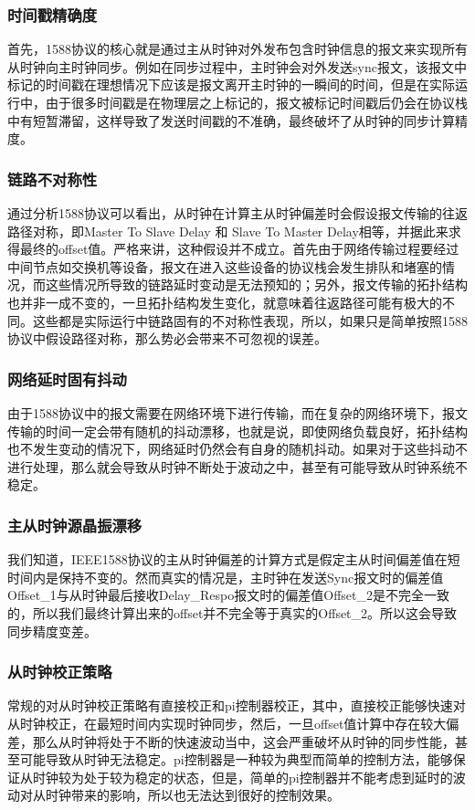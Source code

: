 \subsubsection{时间戳精确度}
\label{sec:1588_problem_timestamp_accu}
首先，1588协议的核心就是通过主从时钟对外发布包含时钟信息的报文来实现所有从时钟向主时钟同步。例如在同步过程中，主时钟会对外发送sync报文，该报文中标记的时间戳在理想情况下应该是报文离开主时钟的一瞬间的时间，但是在实际运行中，由于很多时间戳是在物理层之上标记的，报文被标记时间戳后仍会在协议栈中有短暂滞留，这样导致了发送时间戳的不准确，最终破坏了从时钟的同步计算精度。

\subsubsection{链路不对称性}
\label{sec:1588_problem_route_time_delay}
通过分析1588协议可以看出，从时钟在计算主从时钟偏差时会假设报文传输的往返路径对称，即Master To Slave Delay 和 Slave To Master Delay相等，并据此来求得最终的offset值。严格来讲，这种假设并不成立。首先由于网络传输过程要经过中间节点如交换机等设备，报文在进入这些设备的协议栈会发生排队和堵塞的情况，而这些情况所导致的链路延时变动是无法预知的；另外，报文传输的拓扑结构也并非一成不变的，一旦拓扑结构发生变化，就意味着往返路径可能有极大的不同。这些都是实际运行中链路固有的不对称性表现，所以，如果只是简单按照1588协议中假设路径对称，那么势必会带来不可忽视的误差。

\subsubsection{网络延时固有抖动}
由于1588协议中的报文需要在网络环境下进行传输，而在复杂的网络环境下，报文传输的时间一定会带有随机的抖动漂移，也就是说，即使网络负载良好，拓扑结构也不发生变动的情况下，网络延时仍然会有自身的随机抖动。如果对于这些抖动不进行处理，那么就会导致从时钟不断处于波动之中，甚至有可能导致从时钟系统不稳定。

\subsubsection{主从时钟源晶振漂移}
我们知道，IEEE1588协议的主从时钟偏差的计算方式是假定主从时间偏差值在短时间内是保持不变的。然而真实的情况是，主时钟在发送Sync报文时的偏差值Offset\_1与从时钟最后接收Delay\_Respo报文时的偏差值Offset\_2是不完全一致的，所以我们最终计算出来的offset并不完全等于真实的Offset\_2。所以这会导致同步精度变差。

\subsubsection{从时钟校正策略}
常规的对从时钟校正策略有直接校正和pi控制器校正，其中，直接校正能够快速对从时钟校正，在最短时间内实现时钟同步，然后，一旦offset值计算中存在较大偏差，那么从时钟将处于不断的快速波动当中，这会严重破坏从时钟的同步性能，甚至可能导致从时钟无法稳定。pi控制器是一种较为典型而简单的控制方法，能够保证从时钟较为处于较为稳定的状态，但是，简单的pi控制器并不能考虑到延时的波动对从时钟带来的影响，所以也无法达到很好的控制效果。

